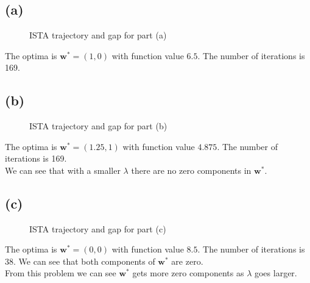 \documentclass[12pt,letterpaper]{article}
\begin{document}
\section{}

\subsection*{(a)}
\begin{figure}[htbp]
\centering
{}
\caption{ISTA trajectory and gap for part (a) }
\label{4a}
\end{figure}
The optima is $\boldsymbol{w}^*=(1,0)$ with function value $6.5$. The number of iterations is 169.
\subsection*{(b)}
\begin{figure}[htbp]
\centering
{}
\caption{ISTA trajectory and gap for part (b) }
\label{4b}
\end{figure}
The optima is $\boldsymbol{w}^*=(1.25,1)$ with function value $4.875$. The number of iterations is 169.\\
We can see that with a smaller $\lambda$ there are no zero components in $\boldsymbol{w}^*$.
\subsection*{(c)}

\begin{figure}[htbp]
\centering
{}
\caption{ISTA trajectory and gap for part (c) }
\label{4c}
\end{figure}
The optima is $\boldsymbol{w}^*=(0,0)$ with function value $8.5$. The number of iterations is 38. We can see that both components of $\boldsymbol{w}^*$ are zero.\\
From this problem we can see $\boldsymbol{w}^*$ gets more zero components as $\lambda$ goes larger.
\end{document}
